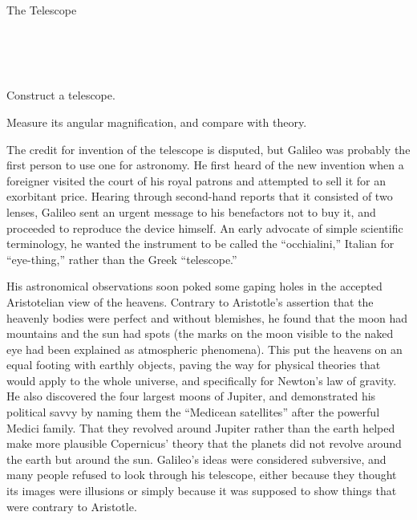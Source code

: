 

\begin{lab}{The Telescope}\label{lab:telescope}

\apparatus
{}\\
\\
\\

\begin{goals}

\item[] Construct a telescope.

\item[] Measure its angular magnification, and compare with theory.

\end{goals}

\labintroduction

The credit for invention of the telescope is disputed, but
Galileo was probably the first person to use one for
astronomy. He first heard of the new invention when a
foreigner visited the court of his royal patrons and
attempted to sell it for an exorbitant price. Hearing
through second-hand reports that it consisted of two lenses,
Galileo sent an urgent message to his benefactors not to buy
it, and proceeded to reproduce the device himself. An early
advocate of simple scientific terminology, he wanted the
instrument to be called the ``occhialini,'' Italian for
``eye-thing,'' rather than the Greek ``telescope.''

His astronomical observations soon poked some gaping holes
in the accepted Aristotelian view of the heavens. Contrary
to Aristotle's assertion that the heavenly bodies were
perfect and without blemishes, he found that the moon had
mountains and the sun had spots (the marks on the moon
visible to the naked eye had been explained as
atmospheric phenomena). This put the heavens on
an equal footing with earthly objects, paving the way for
physical theories that would apply to the whole universe,
and specifically for Newton's law of gravity. He also
discovered the four largest moons of Jupiter, and demonstrated
his political savvy by naming them the ``Medicean satellites''
after the powerful Medici family. That they
revolved around Jupiter rather than the earth helped make
more plausible Copernicus' theory that the planets did not
revolve around the earth but around the sun. Galileo's ideas
were considered subversive, and many people refused to look
through his telescope, either because they thought its images were
illusions or simply because it was supposed to show things
that were contrary to Aristotle.


\end{lab}
